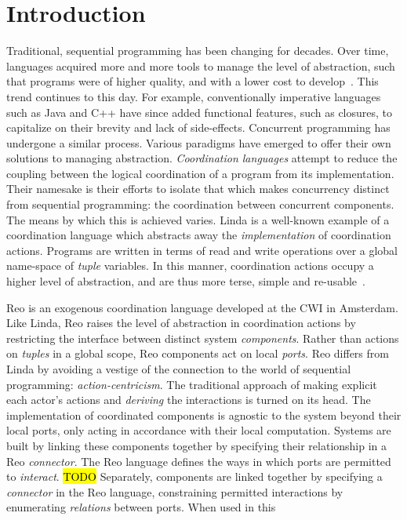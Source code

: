 \chapter{Introduction}	


Traditional, sequential programming has been changing for decades. Over time, languages acquired more and more tools to manage the level of abstraction, such that programs were of higher quality, and with a lower cost to develop~\cite{shaw1984abstraction}. This trend continues to this day. For example, conventionally imperative languages such as Java and C++ have since added functional features, such as closures, to capitalize on their brevity and lack of side-effects. Concurrent programming has undergone a similar process. Various paradigms have emerged to offer their own solutions to managing abstraction. \textit{Coordination languages} attempt to reduce the coupling between the logical coordination of a program from its implementation. Their namesake is their efforts to isolate that which makes concurrency distinct from sequential programming: the coordination between concurrent components. The means by which this is achieved varies. Linda is a well-known example of a coordination language which abstracts away the \textit{implementation} of coordination actions. Programs are written in terms of read and write operations over a global name-space of \textit{tuple} variables. In this manner, coordination actions occupy a higher level of abstraction, and are thus more terse, simple and re-usable~\cite{gelernter1985generative}.


Reo is an exogenous coordination language developed at the CWI in Amsterdam. Like Linda, Reo raises the level of abstraction in coordination actions by restricting the interface between distinct system \textit{components}. Rather than actions on \textit{tuples} in a global scope, Reo components act on local \textit{ports}. Reo differs from Linda by avoiding a vestige of the connection to the world of sequential programming: \textit{action-centricism}. The traditional approach of making explicit each actor's actions and \textit{deriving} the interactions is turned on its head. The implementation of coordinated components is agnostic to the system beyond their local ports, only acting in accordance with their local computation. Systems are built by linking these components together by specifying their relationship in a Reo \textit{connector}. The Reo language defines the ways in which ports are permitted to \textit{interact}. 
\hl{TODO}
Separately, components are linked together by specifying a \textit{connector} in the Reo language, constraining permitted interactions by enumerating \textit{relations} between ports. When used in this

